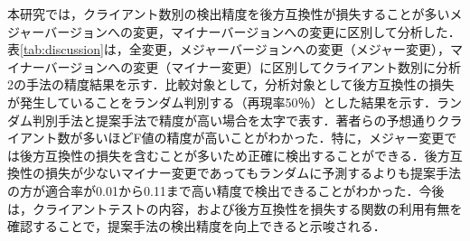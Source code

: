 \documentclass[submit]{ipsj}
\begin{document}
{本研究では，クライアント数別の検出精度を後方互換性が損失することが多いメジャーバージョンへの変更，マイナーバージョンへの変更に区別して分析した．
表\ref{tab:discussion}は，全変更，メジャーバージョンへの変更（メジャー変更），マイナーバージョンへの変更（マイナー変更）に区別してクライアント数別に分析2の手法の精度結果を示す．比較対象として，分析対象として後方互換性の損失が発生していることをランダム判別する（再現率50％）とした結果を示す．ランダム判別手法と提案手法で精度が高い場合を太字で表す．著者らの予想通りクライアント数が多いほどF値の精度が高いことがわかった．特に，メジャー変更では後方互換性の損失を含むことが多いため正確に検出することができる．後方互換性の損失が少ないマイナー変更であってもランダムに予測するよりも提案手法の方が適合率が0.01から0.11まで高い精度で検出できることがわかった．今後は，クライアントテストの内容，および後方互換性を損失する関数の利用有無を確認することで，提案手法の検出精度を向上できると示唆される．

}
\end{document}
